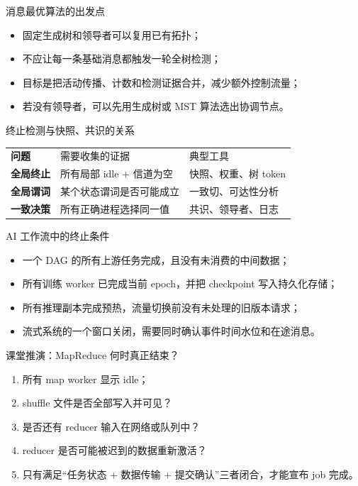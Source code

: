 \documentclass[UTF8,fontset=none,aspectratio=169,10pt]{beamer}
\begin{document}

\begin{frame}{消息最优算法的出发点}
\begin{itemize}
  \item 固定生成树和领导者可以复用已有拓扑；
  \item 不应让每一条基础消息都触发一轮全树检测；
  \item 目标是把活动传播、计数和检测证据合并，减少额外控制流量；
  \item 若没有领导者，可以先用生成树或 MST 算法选出协调节点。
\end{itemize}
\end{frame}

\begin{frame}{终止检测与快照、共识的关系}
\begin{tabularx}{\linewidth}{>{\bfseries}p{3cm}XX}
\toprule
问题 & 需要收集的证据 & 典型工具 \\
全局终止 & 所有局部 idle + 信道为空 & 快照、权重、树 token \\
全局谓词 & 某个状态谓词是否可能成立 & 一致切、可达性分析 \\
一致决策 & 所有正确进程选择同一值 & 共识、领导者、日志 \\
\bottomrule
\end{tabularx}
\vfill
{}
\end{frame}

\begin{frame}{AI 工作流中的终止条件}
\begin{itemize}
  \item 一个 DAG 的所有上游任务完成，且没有未消费的中间数据；
  \item 所有训练 worker 已完成当前 epoch，并把 checkpoint 写入持久化存储；
  \item 所有推理副本完成预热，流量切换前没有未处理的旧版本请求；
  \item 流式系统的一个窗口关闭，需要同时确认事件时间水位和在途消息。
\end{itemize}
\vfill
{}
\end{frame}

\begin{frame}{课堂推演：MapReduce 何时真正结束？}
\begin{enumerate}
  \item 所有 map worker 显示 idle；
  \item shuffle 文件是否全部写入并可见？
  \item 是否还有 reducer 输入在网络或队列中？
  \item reducer 是否可能被迟到的数据重新激活？
  \item 只有满足“任务状态 + 数据传输 + 提交确认”三者闭合，才能宣布 job 完成。
\end{enumerate}
\end{frame}
\end{document}
